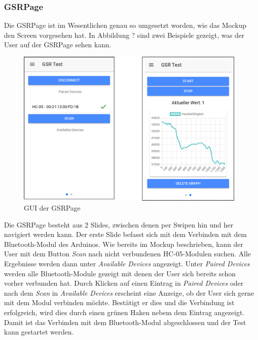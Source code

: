 \subsubsection{GSRPage}
Die GSRPage ist im Wesentlichen genau so umgesetzt worden, wie das Mockup den Screen vorgesehen hat. In Abbildung ? sind zwei Beispiele gezeigt, was der User auf der GSRPage sehen kann. \newline
\begin{figure}[h]
	\centering
	\includegraphics[width=13.5cm]{Bilder/gsrpage.png}
	\caption[GUI der GSRPage]{GUI der GSRPage}
\end{figure}%
\newline
Die GSRPage besteht aus 2 Slides, zwischen denen per Swipen hin und  her navigiert werden kann. Der erste Slide befasst sich mit dem Verbinden mit dem Bluetooth-Modul des Arduinos. Wie bereits im Mockup beschrieben, kann der User mit dem Button \textit{Scan} nach nicht verbundenen HC-05-Modulen suchen. Alle Ergebnisse werden dann unter \textit{Available Devices} angezeigt. \newline Unter \textit{Paired Devices} werden alle Bluetooth-Module gezeigt mit denen der User sich bereits schon vorher verbunden hat. Durch Klicken auf einen Eintrag in \textit{Paired Devices} oder nach dem \textit{Scan} in \textit{Available Devices} erscheint eine Anzeige, ob der User sich gerne mit dem Modul verbinden möchte. Bestätigt er dies und die Verbindung ist erfolgreich, wird dies durch einen grünen Haken nebem dem Eintrag angezeigt. Damit ist das Verbinden mit dem Bluetooth-Modul abgeschlossen und der Test kann gestartet werden. \newline
